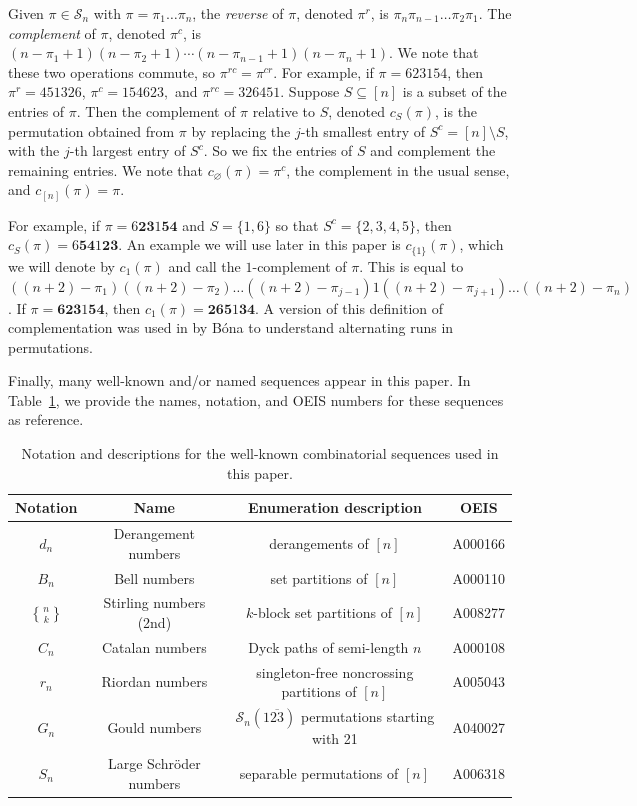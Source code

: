 \documentclass[11pt]{article}
\newcommand{\ol}[1]{\overline{#1}}
\renewcommand\S{\mathcal S}
\theoremstyle{definition}
\newcommand{\stirling}[2]{\genfrac{\{}{\}}{0pt}{}{#1}{#2}}
\begin{document}
Given $\pi \in \S_n$ with $\pi = \pi_1\ldots\pi_n$, the \emph{reverse} of $\pi$, denoted $\pi^r$, is $\pi_{n} \pi_{n-1} \ldots \pi_2 \pi_1$. The \emph{complement} of $\pi$, denoted $\pi^c$, is $(n-\pi_1 + 1)(n-\pi_2 + 1) \cdots (n-\pi_{n-1} + 1) (n-\pi_n + 1)$. We note that these two operations commute, so $\pi^{rc} = \pi^{cr}$. For example, if $\pi = 623154$, then $\pi^r = 451326$, $\pi^c = 154623,$ and $\pi^{rc} = 326451$. Suppose $S\subseteq [n]$ is a subset of the entries of $\pi$. Then the complement of $\pi$ relative to $S$, denoted $c_S(\pi)$, is the permutation obtained from $\pi$ by replacing the $j$-th smallest entry of $S^c = [n] \setminus S$, with the $j$-th largest entry of $S^c$. So we fix the entries of $S$ and complement the remaining entries. We note that $c_{\varnothing}(\pi) = \pi^c$, the complement in the usual sense, and $c_{[n]}(\pi) = \pi$.

For example, if $\pi = 6{\mathbf{23}}1{\mathbf{54}}$ and $S = \{1,6\}$ so that $S^c = \{2,3,4,5\}$, then $c_S(\pi) = 6{\mathbf{54}}1{\mathbf{23}}$. An example we will use later in this paper is $c_{\{1\}}(\pi)$, which we will denote by $c_1(\pi)$ and call the $1$-complement of $\pi$. This is equal to $((n+2)-\pi_1)((n+2) - \pi_2) \ldots ((n+2) - \pi_{j-1}) 1 ((n+2) - \pi_{j+1}) \ldots ((n+2) - \pi_{n})$. If $\pi = {\mathbf{623}}1{\mathbf{54}}$, then $c_{1}(\pi) = {\mathbf{265}}1{\mathbf{34}}$. A version of this definition of complementation was used in \cite{Bo21} by B\'ona to understand alternating runs in permutations.


Finally, many well-known and/or named sequences appear in this paper. In Table~\ref{tab: sequences}, we provide the names, notation, and OEIS numbers for these sequences as reference. 

\begin{table}[htbp]
    \centering
    \begin{tabular}{|c|c|c|c|}
    \hline
        Notation & Name & Enumeration description & OEIS \\ \hline \hline
        $d_n$ & Derangement numbers & derangements of $[n]$ & A000166 \\ \hline
        $B_n$ & Bell numbers & set partitions of $[n]$ & A000110 \\ \hline
        $\stirling{n}{k}$ & Stirling numbers (2nd) & $k$-block set partitions of $[n]$ & A008277 \\ \hline
        $C_n$ & Catalan numbers & Dyck paths of semi-length $n$ & A000108 \\ \hline
        $r_n$ & Riordan numbers & singleton-free noncrossing partitions of $[n]$ & A005043 \\ \hline
        $G_n$ & Gould numbers & $\S_n(1\ol{23})$ permutations starting with 21 &  A040027 \\ \hline
        $S_n$ & Large Schr\"oder numbers & separable permutations of $[n]$ & A006318 \\ \hline
    \end{tabular}
    \caption{Notation and descriptions for the well-known combinatorial sequences used in this paper.}
    \label{tab: sequences}
\end{table}
\end{document}
